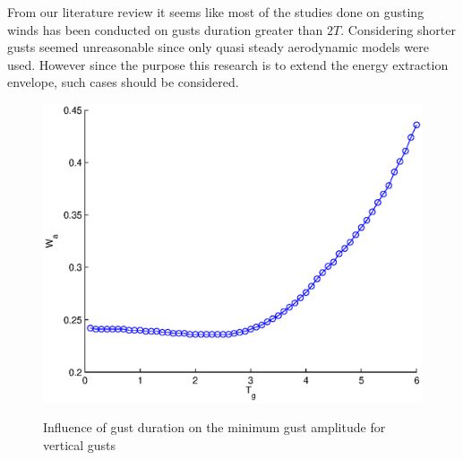 

From our literature review it seems like most of the studies done on gusting winds has been conducted on gusts duration greater than $2T$.
Considering shorter gusts seemed unreasonable since only quasi steady aerodynamic models were used. 
However since the purpose this research is to extend the energy extraction envelope, such cases should be considered.

\begin{figure}[h!]
  \begin{center}
    \scalebox{0.8}
    {\includegraphics{./Figures/Wg_vs_TG_windtype=1_alhpamax=12_nodalphalimit.eps}}
  \end{center}
  \caption{Influence of gust duration on the minimum gust amplitude for vertical gusts}
  \label{fig:vertical_amplitude_duration}
\end{figure}

